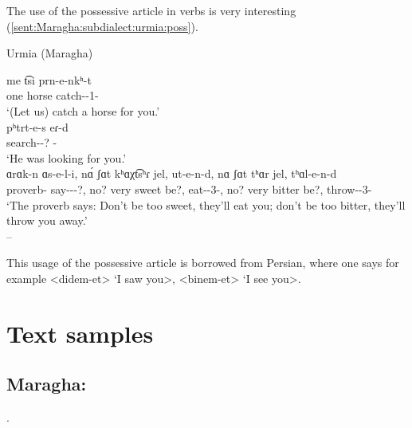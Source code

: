 The use of the possessive article in verbs is very interesting (\ref{sent:Maragha:subdialect:urmia:poss}).

\begin{exe}
	\ex Urmia (Maragha)
	\label{sent:Maragha:subdialect:urmia:poss}
	\begin{xlist}
		\ex \gll me t͡si prn-e-nkʰ-t \\
		one horse catch-{\thgloss}-1{\pl}-{\possSsg} \\
		\trans `(Let us) catch a horse for you.' \\
		\ex \gll pʰtrt-e-s eɾ-d\\
		search-{\thgloss}-{\impfcvb}? {\pst}-{\possSsg} \\
		\trans `He was looking for you.' \\
		\ex \gll ɑrɑk-n ɑs-e-l-i, n\'ɑ ʃɑt kʰɑχt͡sʰɾ jel, ut-e-n-d, nɑ ʃɑt tʰɑr jel, tʰɑl-e-n-d \\
		proverb-{} say-{\thgloss}-{\infgloss}-?, no? very sweet be?, eat-{\thgloss}-3{\pl}-{\possSsg}, no? very bitter be?, throw-{\thgloss}-3{\pl}-{\possSsg}\\
		\trans `The proverb says: Don't be too sweet, they'll eat you; don't be too bitter, they'll throw you away.'\\
		 -- 
		
	\end{xlist}
\end{exe}

This usage of the possessive article is borrowed from Persian, where one says for example <didem-et> `I saw you>, <binem-et> `I see you>. 

\section{Text samples}

{\sampleoverview}

\subsection{Maragha: }



.

